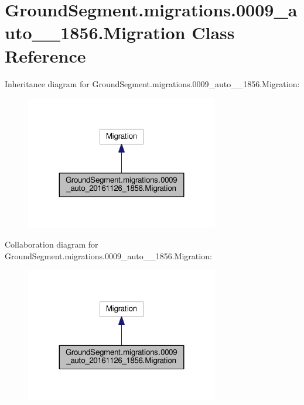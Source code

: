 \hypertarget{class_ground_segment_1_1migrations_1_10009__auto__20161126__1856_1_1_migration}{}\section{Ground\+Segment.\+migrations.0009\+\_\+auto\+\_\+\_\+1856.Migration Class Reference}
\label{class_ground_segment_1_1migrations_1_10009__auto__20161126__1856_1_1_migration}


Inheritance diagram for Ground\+Segment.\+migrations.0009\+\_\+auto\+\_\+\_\+1856.Migration\+:\nopagebreak
\begin{figure}[H]
\begin{center}
\leavevmode
\includegraphics[width=239pt]{class_ground_segment_1_1migrations_1_10009__auto__20161126__1856_1_1_migration__inherit__graph}
\end{center}
\end{figure}


Collaboration diagram for Ground\+Segment.\+migrations.0009\+\_\+auto\+\_\+\_\+1856.Migration\+:\nopagebreak
\begin{figure}[H]
\begin{center}
\leavevmode
\includegraphics[width=239pt]{class_ground_segment_1_1migrations_1_10009__auto__20161126__1856_1_1_migration__coll__graph}
\end{center}
\end{figure}
